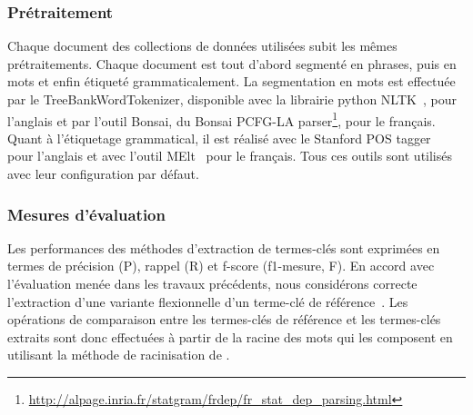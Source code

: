     \subsubsection{Prétraitement}
    \label{subsubsec:pretraitement}
      Chaque document des collections de données utilisées subit les mêmes
      prétraitements. Chaque document est tout d'abord segmenté en phrases, puis
      en mots et enfin étiqueté grammaticalement. La segmentation en mots
      est effectuée par le TreeBankWordTokenizer, disponible avec la librairie
      python NLTK~\cite[\textit{Natural Language ToolKit}]{bird2009nltk}, pour
      l'anglais et par l'outil Bonsai, du Bonsai PCFG-LA
      parser\footnote{\url{http://alpage.inria.fr/statgram/frdep/fr_stat_dep_parsing.html}},
      pour le français. Quant à l'étiquetage grammatical, il est
      réalisé avec le Stanford POS tagger~\cite{toutanova2003stanfordpostagger}
      pour l'anglais et avec l'outil MElt~\cite{denis2009melt} pour le français.
      Tous ces outils sont utilisés avec leur configuration par défaut.

    \subsubsection{Mesures d'évaluation}
    \label{subsubsec:mesures_d_evaluation}
      Les performances des méthodes d'extraction de termes-clés sont exprimées
      en termes de précision (P), rappel (R) et f-score (f1-mesure, F). En
      accord avec l'évaluation menée dans les travaux précédents, nous
      considérons correcte l'extraction d'une variante flexionnelle d'un
      terme-clé de référence~\cite{kim2010semeval}. Les opérations de
      comparaison entre les termes-clés de référence et les termes-clés extraits
      sont donc effectuées à partir de la racine des mots qui les composent en
      utilisant la méthode de racinisation de
      .

